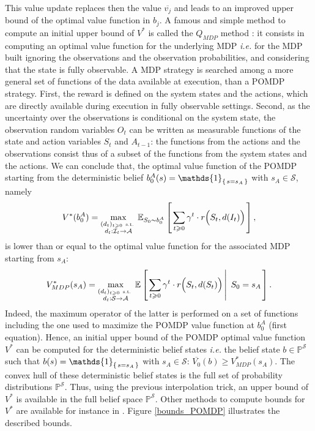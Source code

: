 This value update replaces then the value $\overline{v_j}$
and leads to an improved upper bound of the optimal value function in $b_j$.
A famous and simple method to compute an initial upper bound of $V^*$ 
is called the $Q_{MDP}$ method \cite{Littman96algorithmsfor}: 
it consists in computing an optimal value function
for the underlying MDP \textit{i.e.} for the MDP built 
ignoring the observations and the observation probabilities, 
and considering that the state is fully observable.
A MDP strategy is searched among a more general set of functions 
of the data available at execution, 
than a POMDP strategy. 
First, the reward is defined on the system states and the actions,
which are directly available during execution in fully observable settings. 
Second, as the uncertainty over the observations is conditional on the system state,
the observation random variables $O_t$ can be written as measurable functions of the state and action variables $S_t$ and $A_{t-1}$:
the functions from the actions and the observations consist thus of a subset of the functions from the system states and the actions.
We can conclude that, the optimal value function of the POMDP starting from the deterministic belief $b^A_0(s) = \mathds{1}_{ \set{s=s_A}}$ with $s_A \in \mathcal{S}$,
namely 
\[ V^*(b^A_0) = \max_{  \substack{ (d_t)_{t \geqslant 0} \mbox{ \tiny s.t. } \\ d_t: \mathcal{I}_t \rightarrow \mathcal{A}  }} \mathbb{E}_{S_0 \sim b^A_0} \left[ \left.  \sum_{t \geqslant 0} \gamma^t \cdot r\Big(S_t,d(I_t)\Big)  \right. \right], \]
is lower than or equal to the optimal value function for the associated MDP starting from $s_A$: 
\[ V_{MDP}^*(s_A) = \max_{  \substack{ (d_t)_{t \geqslant 0} \mbox{ \tiny s.t. } \\ d_t: \mathcal{S} \rightarrow \mathcal{A} } } \mathbb{E} \left[ \left.  \sum_{t \geqslant 0} \gamma^t \cdot r\Big(S_t,d(S_t)\Big) \, \right| \left. \, S_0 = s_A   \right. \right]. \]
Indeed, the maximum operator of the latter 
is performed on a set of functions including 
the one used to maximize the POMDP value function at $b^A_0$ (first equation).
Hence, an initial upper bound of the POMDP optimal value function $V^*$ can be computed for the deterministic belief states \textit{i.e.} 
the belief state $b \in \mathbb{P}^{\mathcal{S}}$ such that $b(s) = \mathds{1}_{\set{ s=s_A }}$ with $s_A \in \mathcal{S}$:
$\overline{V_0}(b) \geqslant V_{MDP}^*(s_A)$. 
The convex hull of these deterministic belief states is the full set of probability distributions $\mathbb{P}^{\mathcal{S}}$.
Thus, using the previous interpolation trick, an upper bound of $V^*$ is available in the full belief space $\mathbb{P}^{\mathcal{S}}$. 
Other methods to compute bounds for $V^*$ are available for instance in \cite{conf/aaai/Hauskrecht97}.
Figure \ref{bounds_POMDP} illustrates the described bounds.

